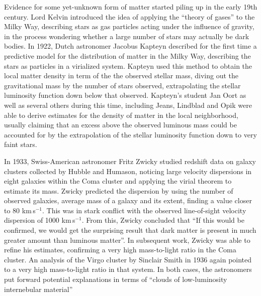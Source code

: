 Evidence for some yet-unknown form of matter started piling up in the early 19th century. Lord Kelvin introduced the idea of applying the ``theory of gases'' to the Milky Way, describing stars as gas particles acting under the influence of gravity, in the process wondering whether a large number of stars may actually be dark bodies. In 1922, Dutch astronomer Jacobus Kapteyn described for the first time a predictive model for the distribution of matter in the Milky Way, describing the stars as particles in a virialized system. Kapteyn used this method to obtain the local matter density in term of the the observed stellar mass, diving out the gravitational mass by the number of stars observed, extrapolating the stellar luminosity function down below that observed. Kapteyn's student Jan Oort as well as several others during this time, including Jeans, Lindblad and Opik were able to derive estimates for the density of matter in the local neighborhood, usually claiming that an excess above the observed luminous mass could be accounted for by the extrapolation of the stellar luminosity function down to very faint stars.

In 1933, Swiss-American astronomer Fritz Zwicky studied redshift data on galaxy clusters collected by Hubble and Humason, noticing large velocity dispersions in eight galaxies within the Coma cluster and applying the virial theorem to estimate its mass. Zwicky predicted the dispersion by using the number of observed galaxies, average mass of a galaxy and its extent, finding a value closer to 80 km\,s$^{-1}$. This was in stark conflict with the observed line-of-sight velocity dispersion of 1000 km\,s$^{-1}$. From this, Zwicky concluded that ``If this would be confirmed, we would get the surprising result that dark matter is present in much greater amount than luminous matter''. In subsequent work, Zwicky was able to refine his estimates, confirming a very high mass-to-light ratio in the Coma cluster. An analysis of the Virgo cluster by Sinclair Smith in 1936 again pointed to a very high mass-to-light ratio in that system. In both cases, the astronomers put forward potential explanations in terms of ``clouds of low-luminosity internebular material''

